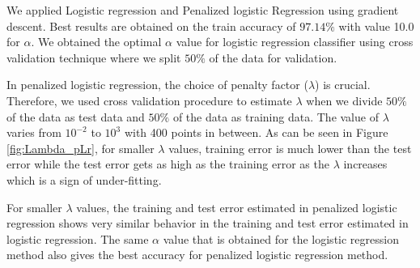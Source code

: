 {We applied Logistic regression and Penalized logistic Regression using gradient descent. Best results are obtained on the train accuracy of $97.14\%$ with value 10.0 for $\alpha$. We obtained the optimal $\alpha$ value for logistic regression classifier using cross validation technique where we split $50\%$ of the data for validation.

In penalized logistic regression, the choice of penalty factor ($\lambda$) is crucial. Therefore, we used cross validation procedure to estimate $\lambda$ when we divide $50\%$ of the data as test data and $50\%$ of the data as training data. The value of $\lambda$ varies from $10^{-2}$ to $10^3$ with 400 points in between. As can be seen in Figure \ref{fig:Lambda_pLr}, for smaller $\lambda$ values, training error is much lower than the test error while the test error gets as high as the training error  as the $\lambda$ increases which is a sign of under-fitting. 

For smaller $\lambda$ values, the training and test error estimated in penalized logistic regression shows very similar behavior in the training and test error estimated in logistic regression. The same $\alpha$ value that is obtained for the logistic regression method also gives the best accuracy for penalized logistic regression method.

}
